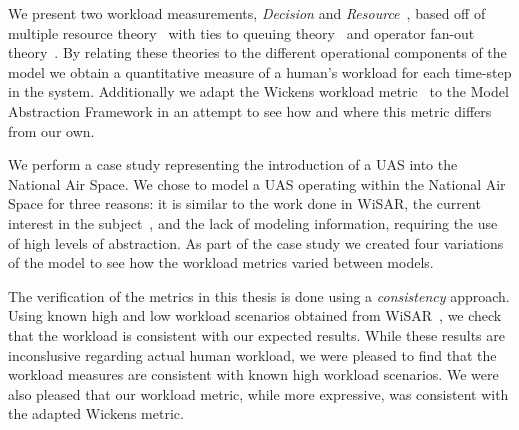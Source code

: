 We present two workload measurements, {\em Decision} and {\em Resource}~\cite{cite jared}, based off of multiple resource theory~\cite{wickens2002multiple} with ties to queuing theory~\cite{newell1994unified} and operator fan-out theory~\cite{goodrich2010fanout}.  By relating these theories to the different operational components of the model we obtain a quantitative measure of a human's workload for each time-step in the system.  Additionally we adapt the Wickens workload metric~\cite{wickens2002multiple} to the Model Abstraction Framework in an attempt to see how and where this metric differs from our own.

We perform a case study representing the introduction of a UAS into the National Air Space.  We chose to model a UAS operating within the National Air Space for three reasons: it is similar to the work done in WiSAR, the current interest in the subject~\cite{nasroadmap}, and the lack of modeling information, requiring the use of high levels of abstraction.  As part of the case study we created four variations of the model to see how the workload metrics varied between models.

The verification of the metrics in this thesis is done using a {\em consistency} approach.  Using known high and low workload scenarios obtained from WiSAR~\cite{Adams2009Cognitive}, we check that the workload is consistent with our expected results.  While these results are inconslusive regarding actual human workload, we were pleased to find that the workload measures are consistent with known high workload scenarios.  We were also pleased that our workload metric, while more expressive, was consistent with the adapted Wickens metric.

\begin{comment}
   Known high and low workload scenarios, similar to those in WiSAR, are placed in the model.  Workload is consistent if it rises and falls as expected given known scenarios, and a {\em sensitivity}We were very pleased with the results of this case study.  Firstly because the Model Abstraction Framework proved capable of expressing our highly abstracted model.  Second, by using a {\em consistency}

using the Workload Viewer we were able to show that the Model Abstraction Framework is capable of expressing a UAS using high levels of abstraction.  The results of   They also demonstrate the ability to model systems using varying degrees of abstraction.  The verification of the metrics in this thesis is done by a {\em consistency} approach, showing that workload rises and falls as expected given known difficult and easy scenarios, respectively.  Future work will provide a more detailed verification.
\end{comment}

